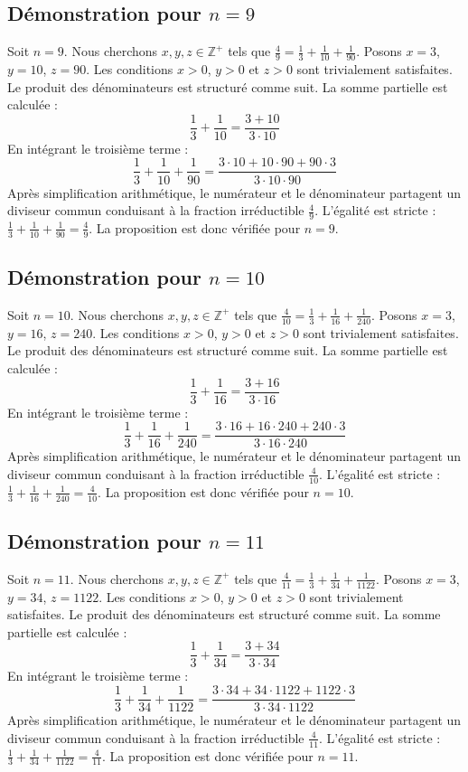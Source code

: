 \documentclass[11pt,a4paper]{article}
\begin{document}
\subsection{Démonstration pour $n = 9$}
Soit $n = 9$. Nous cherchons $x, y, z \in \mathbb{Z}^{+}$ tels que $\frac{4}{9} = \frac{1}{3} + \frac{1}{10} + \frac{1}{90}$.
Posons $x = 3$, $y = 10$, $z = 90$.
Les conditions $x > 0$, $y > 0$ et $z > 0$ sont trivialement satisfaites.
Le produit des dénominateurs est structuré comme suit. La somme partielle est calculée :
$$ \frac{1}{3} + \frac{1}{10} = \frac{3+10}{3 \cdot 10} $$
En intégrant le troisième terme :
$$ \frac{1}{3} + \frac{1}{10} + \frac{1}{90} = \frac{3 \cdot 10 + 10 \cdot 90 + 90 \cdot 3}{3 \cdot 10 \cdot 90} $$
Après simplification arithmétique, le numérateur et le dénominateur partagent un diviseur commun conduisant à la fraction irréductible $\frac{4}{9}$.
L'égalité est stricte : $\frac{1}{3} + \frac{1}{10} + \frac{1}{90} = \frac{4}{9}$.
La proposition est donc vérifiée pour $n = 9$.
\subsection{Démonstration pour $n = 10$}
Soit $n = 10$. Nous cherchons $x, y, z \in \mathbb{Z}^{+}$ tels que $\frac{4}{10} = \frac{1}{3} + \frac{1}{16} + \frac{1}{240}$.
Posons $x = 3$, $y = 16$, $z = 240$.
Les conditions $x > 0$, $y > 0$ et $z > 0$ sont trivialement satisfaites.
Le produit des dénominateurs est structuré comme suit. La somme partielle est calculée :
$$ \frac{1}{3} + \frac{1}{16} = \frac{3+16}{3 \cdot 16} $$
En intégrant le troisième terme :
$$ \frac{1}{3} + \frac{1}{16} + \frac{1}{240} = \frac{3 \cdot 16 + 16 \cdot 240 + 240 \cdot 3}{3 \cdot 16 \cdot 240} $$
Après simplification arithmétique, le numérateur et le dénominateur partagent un diviseur commun conduisant à la fraction irréductible $\frac{4}{10}$.
L'égalité est stricte : $\frac{1}{3} + \frac{1}{16} + \frac{1}{240} = \frac{4}{10}$.
La proposition est donc vérifiée pour $n = 10$.
\subsection{Démonstration pour $n = 11$}
Soit $n = 11$. Nous cherchons $x, y, z \in \mathbb{Z}^{+}$ tels que $\frac{4}{11} = \frac{1}{3} + \frac{1}{34} + \frac{1}{1122}$.
Posons $x = 3$, $y = 34$, $z = 1122$.
Les conditions $x > 0$, $y > 0$ et $z > 0$ sont trivialement satisfaites.
Le produit des dénominateurs est structuré comme suit. La somme partielle est calculée :
$$ \frac{1}{3} + \frac{1}{34} = \frac{3+34}{3 \cdot 34} $$
En intégrant le troisième terme :
$$ \frac{1}{3} + \frac{1}{34} + \frac{1}{1122} = \frac{3 \cdot 34 + 34 \cdot 1122 + 1122 \cdot 3}{3 \cdot 34 \cdot 1122} $$
Après simplification arithmétique, le numérateur et le dénominateur partagent un diviseur commun conduisant à la fraction irréductible $\frac{4}{11}$.
L'égalité est stricte : $\frac{1}{3} + \frac{1}{34} + \frac{1}{1122} = \frac{4}{11}$.
La proposition est donc vérifiée pour $n = 11$.
\end{document}
